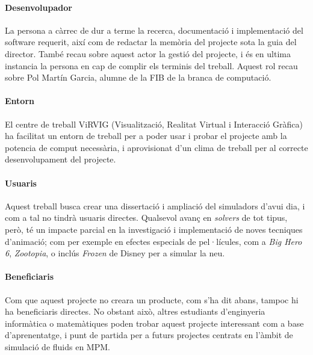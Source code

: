 \documentclass[a4paper]{report}
\begin{document}
	\paragraph{Desenvolupador} La persona a càrrec de dur a terme la recerca, documentació i implementació del software requerit, així com de redactar la memòria del projecte sota la guia del director. També recau sobre aquest actor la gestió del projecte, i és en ultima instancia la persona en cap de complir els terminis del treball. Aquest rol recau sobre Pol Martín Garcia, alumne de la FIB de la branca de computació.
	\paragraph{Entorn} El centre de treball ViRVIG (Visualització, Realitat Virtual i Interacció Gràfica) ha facilitat un entorn de treball per a poder usar i probar el projecte amb la potencia de comput necessària, i aprovisionat d'un clima de treball per al correcte desenvolupament del projecte.
	\paragraph{Usuaris} Aquest treball busca crear una dissertació i ampliació del simuladors d'avui dia, i com a tal no tindrà usuaris directes. Qualsevol avanç en \textit{solvers} de tot tipus, però, té un impacte parcial en la investigació i implementació de noves tecniques d'animació; com per exemple en efectes especials de pel·lícules, com a \textit{Big Hero 6}, \textit{Zootopia}, o inclús \textit{Frozen} de Disney\cite{Stomakhin} per a simular la neu.  
	\paragraph{Beneficiaris} Com que aquest projecte no creara un producte, com s'ha dit abans, tampoc hi ha beneficiaris directes. No obstant això, altres estudiants d'enginyeria informàtica o matemàtiques poden trobar aquest projecte interessant com a base d'aprenentatge, i punt de partida per a futurs projectes centrats en l'àmbit de simulació de fluids en MPM. 
	
\end{document}

